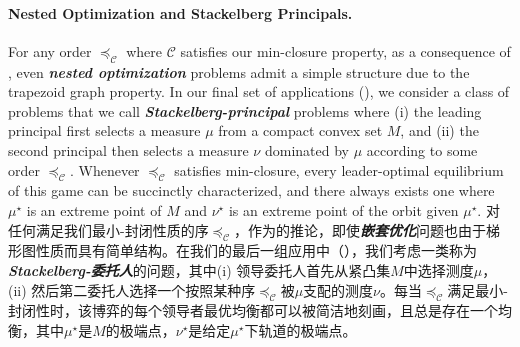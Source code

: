 \documentclass[12pt,letterpaper]{article}
\newenvironment{original}{\color{black}}{}
\newenvironment{translation}{\color{blue}}{}
\theoremstyle{plain}
\theoremstyle{definition}
\theoremstyle{remark}
\newcommand{\C}{\mathcal{C}}
\theoremstyle{definition}
\begin{document}
\paragraph{Nested Optimization and Stackelberg Principals.}\hspace{-2mm}
\begin{original}
For any order $\preceq_\C$ where $\C$ satisfies our min-closure property, as a consequence of , even \textit{\textbf{nested optimization}} problems admit a simple structure due to the trapezoid graph property. In our final set of applications (), we consider a class of problems that we call \textit{\textbf{Stackelberg-principal}} problems where (i) the leading principal first selects a measure $\mu$ from a compact convex set $M$, and (ii) the second principal then selects a measure $\nu$ dominated by $\mu$ according to some order $\preceq_\C$. Whenever $\preceq_\C$ satisfies min-closure, every leader-optimal equilibrium of this game can be succinctly characterized, and there always exists one where $\mu^\star$ is an extreme point of $M$ and $\nu^\star$ is an extreme point of the orbit given $\mu^\star$.
\end{original}
\begin{translation}
对任何满足我们最小-封闭性质的序$\preceq_\C$，作为的推论，即使\textit{\textbf{嵌套优化}}问题也由于梯形图性质而具有简单结构。在我们的最后一组应用中（），我们考虑一类称为\textit{\textbf{Stackelberg-委托人}}的问题，其中(i) 领导委托人首先从紧凸集$M$中选择测度$\mu$，(ii) 然后第二委托人选择一个按照某种序$\preceq_\C$被$\mu$支配的测度$\nu$。每当$\preceq_\C$满足最小-封闭性时，该博弈的每个领导者最优均衡都可以被简洁地刻画，且总是存在一个均衡，其中$\mu^\star$是$M$的极端点，$\nu^\star$是给定$\mu^\star$下轨道的极端点。
\end{translation}
\end{document}
